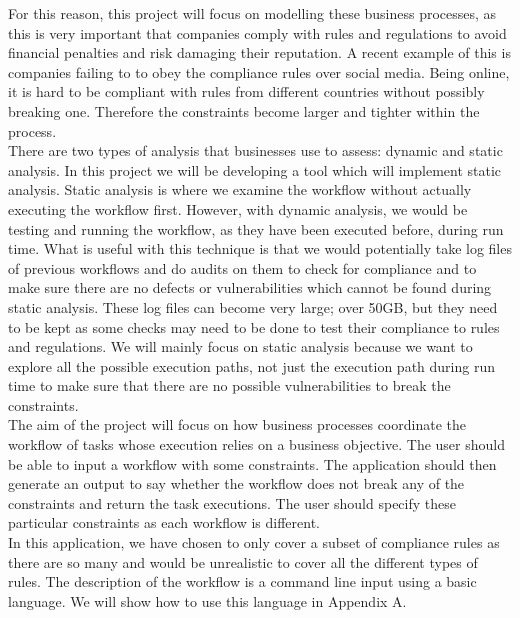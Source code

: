 \documentclass[a4paper]{report}
\begin{document}
For this reason, this project will focus on modelling these business processes, as this is very important that companies comply with rules and regulations to avoid financial penalties and risk damaging their reputation. A recent example of this is companies failing to to obey the compliance rules over social media\cite{Compliance}. Being online, it is hard to be compliant with rules from different countries without possibly breaking one. Therefore the constraints become larger and tighter within the process. \\   

There are two types of analysis that businesses use to assess: dynamic and static analysis\cite{analysis}. In this project we will be developing a tool which will implement static analysis. Static analysis is where we examine the workflow without actually executing the workflow first. However, with dynamic analysis, we would be testing and running the workflow, as they have been executed before, during run time. What is useful with this technique is that we would potentially take log files of previous workflows and do audits on them to check for compliance and to make sure there are no defects or vulnerabilities which cannot be found during static analysis. These log files can become very large; over 50GB, but they need to be kept as some checks may need to be done to test their compliance to rules and regulations. We will mainly focus on static analysis because we want to explore all the possible execution paths, not just the execution path during run time to make sure that there are no possible vulnerabilities to break the constraints. \\

The aim of the project will focus on how business processes coordinate the workflow of tasks whose execution relies on a business objective. The user should be able to input a workflow with some constraints. The application should then generate an output to say whether the workflow does not break any of the constraints and return the task executions. The user should specify these particular constraints as each workflow is different. \\

In this application, we have chosen to only cover a subset of compliance rules as there are so many and would be unrealistic to cover all the different types of rules. The description of the workflow is a command line input using a basic language. We will show how to use this language in Appendix A. 
\end{document}
